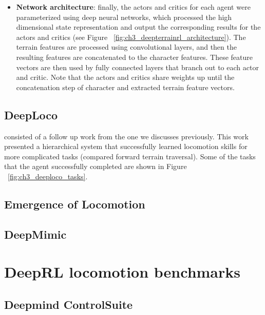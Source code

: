 \begin{itemize}
    \item \textbf{Network architecture}: finally, the actors and critics for each
          agent were parameterized using deep neural networks, which processed the
          high dimensional state representation and output the corresponding results
          for the actors and critics (see Figure ~\ref{fig:ch3_deepterrainrl_architecture}).
          The terrain features are processed using convolutional layers, and then
          the resulting features are concatenated to the character features. These
          feature vectors are then used by fully connected layers that branch out
          to each actor and critic. Note that the actors and critics share weights
          up until the concatenation step of character and extracted terrain feature vectors.

          \figDeepTerrainRLArchitecture

\end{itemize}

\subsection{DeepLoco}

\cite{DeepLoco} consisted of a follow up work from the one we discusses previously.
This work presented a hierarchical system that successfully learned locomotion skills
for more complicated tasks (compared forward terrain traversal). Some of the tasks
that the agent successfully completed are shown in Figure ~\ref{fig:ch3_deeploco_tasks}.


\figDeepLocoTasks
\figDeepLocoSystem
\figDeepLocoStateFeatures
\figDeepLocoArchitectures


\subsection{Emergence of Locomotion}


\subsection{DeepMimic}

\newpage

\section{DeepRL locomotion benchmarks}

\subsection{Deepmind ControlSuite}

